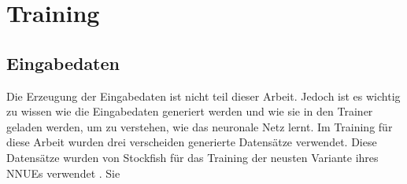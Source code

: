 
\section{Training}

\subsection{Eingabedaten}

Die Erzeugung der Eingabedaten ist nicht teil dieser Arbeit. Jedoch ist es wichtig zu wissen wie die Eingabedaten generiert werden und wie sie in den Trainer geladen werden, um zu verstehen, wie das neuronale Netz lernt. Im Training für diese Arbeit wurden drei verscheiden generierte Datensätze verwendet. Diese Datensätze wurden von Stockfish für das Training der neusten Variante ihres \acp{NNUE} verwendet \cite{StockfishNewestNetJul04}. Sie







